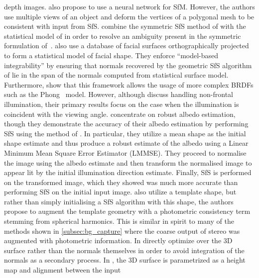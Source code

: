 depth images.
\citet{fanany2004neural,fanany2002analysis} also propose to use a neural network
for SfM. However, the authors use multiple views of an object and deform
the vertices of a polygonal mesh to be consistent with input from SfS.
\citet{dovgard2004statistical} combine the symmetric SfS method of
\citet{yilmaz2002estimation} with the statistical model of
\citet{atick1996statistical} in order to resolve an ambiguity present in
the symmetric formulation of~\cite{yilmaz2002estimation}.
\citet{smith2010estimating} also use a database of facial surfaces
orthographically projected to form a statistical model of facial shape. They
enforce ``model-based integrability'' by ensuring that normals recovered
by the geometric SfS algorithm of \citet{worthington1999new,Smith:2007eb} lie
in the span of the normals computed from statistical surface model. Furthermore,
\citet{smith2010estimating} show that this framework allows the usage of
more complex BRDFs such as the Phong~\cite{tuong1973illumination} model.
However, although \citet{smith2010estimating} discuss handling non-frontal
illumination, their primary results focus on the case when the illumination
is coincident with the viewing angle.
\citet{biswas2009robust} concentrate on robust albedo estimation, though they
demonstrate the accuracy of their albedo estimation by performing SfS using the
method of \citet{ping1994shape}. In particular, they utilize a mean shape as the
initial shape estimate and thus produce a robust estimate of the albedo using a
Linear Minimum Mean Square Error Estimator (LMMSE). They proceed to normalise
the image using the albedo estimate and then transform the normalised image to
appear lit by the initial illumination direction estimate. Finally, SfS is
performed on the transformed image, which they showed was much more accurate
than performing SfS on the initial input image.
\citet{kemelmacher2011facereconstruction} also utilize a template shape, but
rather than simply initialising a SfS algorithm with this shape, the authors
propose to augment the template geometry with a photometric consistency term
stemming from spherical harmonics. This is similar in spirit to many of the
methods shown in \cref{subsec:bg_capture} where the coarse output of stereo was
augmented with photometric information. 
In \citet{kemelmacher2011facereconstruction} directly optimize over the 3D
surface rather than the normals themselves in order to avoid integration of the
normals as a secondary process. In \citet{kemelmacher2011facereconstruction}, 
the 3D surface is parametrized as a height map and alignment between the input
